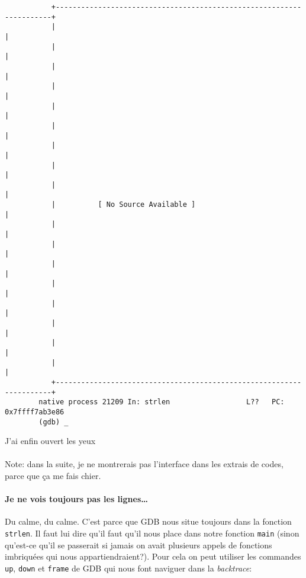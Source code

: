 \begin{listing}[H]
	\begin{verbatim}
		   +---------------------------------------------------------------------+
		   |                                                                     |
		   |                                                                     |
		   |                                                                     |
		   |                                                                     |
		   |                                                                     |
		   |                                                                     |
		   |                                                                     |
		   |                                                                     |
		   |                                                                     |
		   |          [ No Source Available ]                                    |
		   |                                                                     |
		   |                                                                     |
		   |                                                                     |
		   |                                                                     |
		   |                                                                     |
		   |                                                                     |
		   |                                                                     |
		   |                                                                     |
		   +---------------------------------------------------------------------+
		native process 21209 In: strlen                  L??   PC: 0x7ffff7ab3e86
		(gdb) _
	\end{verbatim}
	\caption{J'ai enfin ouvert les yeux}
\end{listing}

\paragraph{} Note: dans la suite, je ne montrerais pas l'interface dans les
extrais de codes, parce que ça me fais chier.

\paragraph{Je ne vois toujours pas les lignes\ldots} Du calme, du calme. C'est
parce que GDB nous situe toujours dans la fonction \texttt{strlen}. Il
faut lui dire qu'il faut qu'il nous place dans notre fonction \texttt{main}
(sinon qu'est-ce qu'il se passerait si jamais on avait plusieurs appels de
fonctions imbriquées qui nous appartiendraient?). Pour cela on peut utiliser
les commandes \texttt{up}, \texttt{down} et \texttt{frame} de GDB qui nous font
naviguer dans la \textit{backtrace}:

